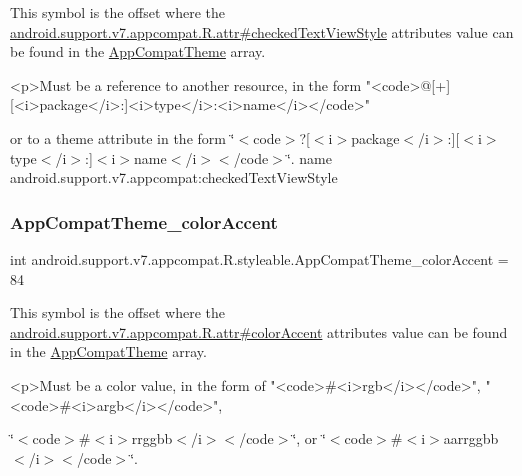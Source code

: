 This symbol is the offset where the \hyperlink{classandroid_1_1support_1_1v7_1_1appcompat_1_1R_1_1attr_a042cf45307b147fc815136c31ed243eb}{android.\+support.\+v7.\+appcompat.\+R.\+attr\#checked\+Text\+View\+Style} attribute\textquotesingle{}s value can be found in the \hyperlink{classandroid_1_1support_1_1v7_1_1appcompat_1_1R_1_1styleable_a5c42f89e8a410c323be34208d75c430b}{App\+Compat\+Theme} array.

\begin{DoxyVerb}      <p>Must be a reference to another resource, in the form "<code>@[+][<i>package</i>:]<i>type</i>:<i>name</i></code>"
\end{DoxyVerb}
 or to a theme attribute in the form \char`\"{}$<$code$>$?\mbox{[}$<$i$>$package$<$/i$>$\+:\mbox{]}\mbox{[}$<$i$>$type$<$/i$>$\+:\mbox{]}$<$i$>$name$<$/i$>$$<$/code$>$\char`\"{}.  name android.\+support.\+v7.\+appcompat\+:checked\+Text\+View\+Style \mbox{\label{classandroid_1_1support_1_1v7_1_1appcompat_1_1R_1_1styleable_aff4d2589b88c34cd389125973debcd18}} 
\subsubsection{\texorpdfstring{App\+Compat\+Theme\+\_\+color\+Accent}{AppCompatTheme\_colorAccent}}
{\footnotesize\ttfamily int android.\+support.\+v7.\+appcompat.\+R.\+styleable.\+App\+Compat\+Theme\+\_\+color\+Accent = 84\hspace{0.3cm}{\ttfamily [static]}}

This symbol is the offset where the \hyperlink{classandroid_1_1support_1_1v7_1_1appcompat_1_1R_1_1attr_a46fb9e9ac72cb8a9a5ec1f8677330f26}{android.\+support.\+v7.\+appcompat.\+R.\+attr\#color\+Accent} attribute\textquotesingle{}s value can be found in the \hyperlink{classandroid_1_1support_1_1v7_1_1appcompat_1_1R_1_1styleable_a5c42f89e8a410c323be34208d75c430b}{App\+Compat\+Theme} array.

\begin{DoxyVerb}      <p>Must be a color value, in the form of "<code>#<i>rgb</i></code>", "<code>#<i>argb</i></code>",
\end{DoxyVerb}
 \char`\"{}$<$code$>$\#$<$i$>$rrggbb$<$/i$>$$<$/code$>$\char`\"{}, or \char`\"{}$<$code$>$\#$<$i$>$aarrggbb$<$/i$>$$<$/code$>$\char`\"{}. 


